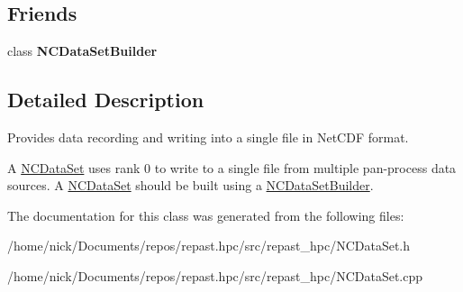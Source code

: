 \subsection*{Friends}
\begin{DoxyCompactItemize}
\item 
\hypertarget{classrepast_1_1_n_c_data_set_acabe4720b4e1263ea1efb10b32c8adf7}{class {\bfseries N\-C\-Data\-Set\-Builder}}\label{classrepast_1_1_n_c_data_set_acabe4720b4e1263ea1efb10b32c8adf7}

\end{DoxyCompactItemize}


\subsection{Detailed Description}
Provides data recording and writing into a single file in Net\-C\-D\-F format. 

A \hyperlink{classrepast_1_1_n_c_data_set}{N\-C\-Data\-Set} uses rank 0 to write to a single file from multiple pan-\/process data sources. A \hyperlink{classrepast_1_1_n_c_data_set}{N\-C\-Data\-Set} should be built using a \hyperlink{classrepast_1_1_n_c_data_set_builder}{N\-C\-Data\-Set\-Builder}. 

The documentation for this class was generated from the following files\-:\begin{DoxyCompactItemize}
\item 
/home/nick/\-Documents/repos/repast.\-hpc/src/repast\-\_\-hpc/N\-C\-Data\-Set.\-h\item 
/home/nick/\-Documents/repos/repast.\-hpc/src/repast\-\_\-hpc/N\-C\-Data\-Set.\-cpp\end{DoxyCompactItemize}
